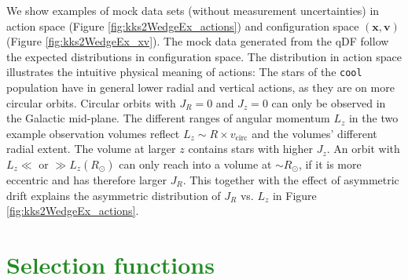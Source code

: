 \documentclass[iop,revtex4,numberedappendix,appendixfloats]{emulateapj}
\newcommand{\vect}[1]{\boldsymbol{#1}}
\newcommand{\NEW}[1]{\textcolor{ForestGreen}{#1}}
\begin{document}
We show examples of mock data sets (without measurement uncertainties) in action space (Figure \ref{fig:kks2WedgeEx_actions}) and configuration space $(\vect{x},\vect{v})$ (Figure \ref{fig:kks2WedgeEx_xv}). The mock data generated from the qDF follow the expected distributions in configuration space. The distribution in action space illustrates the intuitive physical meaning of actions: The stars of the \texttt{cool} population have in general lower radial and vertical actions, as they are on more circular orbits. Circular orbits with $J_R = 0$ and $J_z = 0$ can only be observed in the Galactic mid-plane. The different ranges of angular momentum $L_z$ in the two example observation volumes reflect $L_z \sim R  \times v_\text{circ}$ and the volumes' different radial extent. The volume at larger $z$ contains stars with higher $J_z$.  An orbit with $L_z \ll$ or $\gg L_z(R_\odot)$ can only reach into a volume at $\sim R_\odot$, if it is more eccentric and has therefore larger $J_R$. This together with the effect of asymmetric drift explains the asymmetric distribution of $J_R$ vs. $L_z$ in Figure \ref{fig:kks2WedgeEx_actions}.

\section{\NEW{Selection functions}} \label{app:selectionfunction}%
\end{document}
